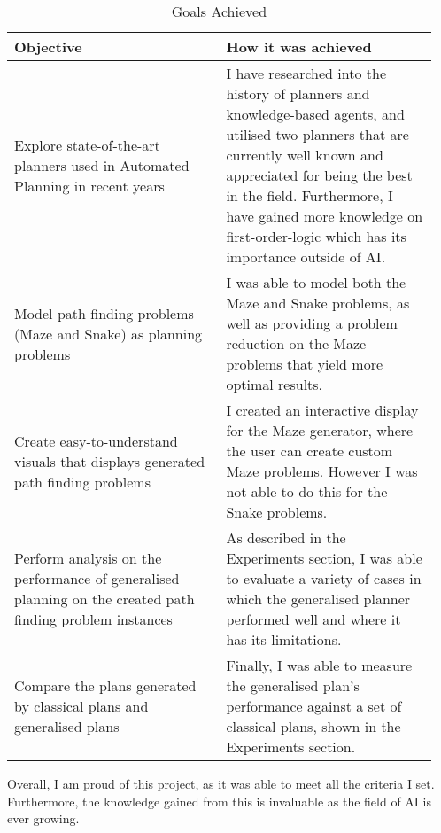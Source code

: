\begin{table}[ht]
\centering
\begin{tabular}{|p{0.473\linewidth}|p{0.473\linewidth}|}
\hline
Objective & How it was achieved \\\hline
Explore state-of-the-art planners used in Automated Planning in recent years & I have researched into the history of planners and knowledge-based agents, and utilised two planners that are currently well known and appreciated for being the best in the field. Furthermore, I have gained more knowledge on first-order-logic which has its importance outside of AI. \\\hline
Model path finding problems (Maze and Snake) as planning problems & I was able to model both the Maze and Snake problems, as well as providing a problem reduction on the Maze problems that yield more optimal results.
\\\hline
Create easy-to-understand visuals that displays generated path finding problems & I created an interactive display for the Maze generator, where the user can create custom Maze problems. However I was not able to do this for the Snake problems.\\\hline
Perform analysis on the performance of generalised planning on the created path finding problem instances & As described in the Experiments section, I was able to evaluate a variety of cases in which the generalised planner performed well and where it has its limitations.
\\\hline
Compare the plans generated by classical plans and generalised plans & Finally, I was able to measure the generalised plan's performance against a set of classical plans, shown in the Experiments section.
\\\hline
\end{tabular}
\caption{Goals Achieved}
\end{table}
\noindent Overall, I am proud of this project, as it was able to meet all the criteria I set. Furthermore, the knowledge gained from this is invaluable as the field of AI is ever growing.

